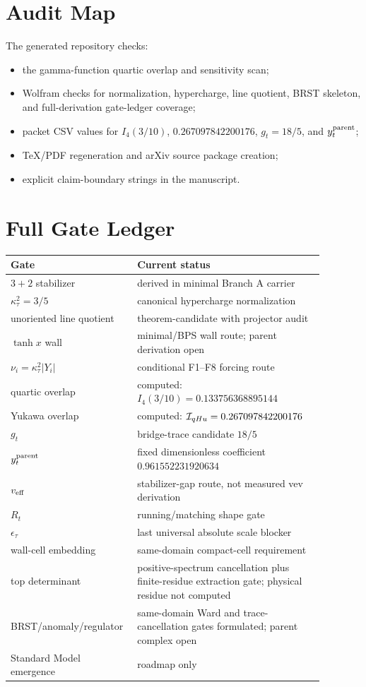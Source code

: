 \documentclass[11pt]{article}
\begin{document}
\section{Audit Map}
The generated repository checks:
\begin{itemize}
\item the gamma-function quartic overlap and sensitivity scan;
\item Wolfram checks for normalization, hypercharge, line quotient, BRST skeleton, and full-derivation gate-ledger coverage;
\item packet CSV values for $I_4(3/10)$, $0.267097842200176$, $g_t=18/5$, and $y_t^{\rm parent}$;
\item TeX/PDF regeneration and arXiv source package creation;
\item explicit claim-boundary strings in the manuscript.
\end{itemize}

\section{Full Gate Ledger}
\begin{longtable}{p{0.30\linewidth}p{0.58\linewidth}}
\toprule
\textbf{Gate} & \textbf{Current status}\\
\midrule
$3+2$ stabilizer & derived in minimal Branch A carrier\\
$\kappa_\tau^2=3/5$ & canonical hypercharge normalization\\
unoriented line quotient & theorem-candidate with projector audit\\
$\tanh x$ wall & minimal/BPS wall route; parent derivation open\\
$\nu_i=\kappa_\tau^2|Y_i|$ & conditional F1--F8 forcing route\\
quartic overlap & computed: $I_4(3/10)=0.133756368895144$\\
Yukawa overlap & computed: ${\cal I}_{qHu}=0.267097842200176$\\
$g_t$ & bridge-trace candidate $18/5$\\
$y_t^{\rm parent}$ & fixed dimensionless coefficient $0.961552231920634$\\
$v_{\rm eff}$ & stabilizer-gap route, not measured vev derivation\\
$R_t$ & running/matching shape gate\\
$\epsilon_\tau$ & last universal absolute scale blocker\\
wall-cell embedding & same-domain compact-cell requirement\\
top determinant & positive-spectrum cancellation plus finite-residue extraction gate; physical residue not computed\\
BRST/anomaly/regulator & same-domain Ward and trace-cancellation gates formulated; parent complex open\\
Standard Model emergence & roadmap only\\
\bottomrule
\end{longtable}
\end{document}
